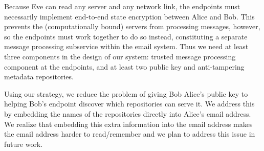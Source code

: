Because Eve can read any server and any network link, the endpoints 
must necessarily implement end-to-end state encryption between Alice 
and Bob.  This prevents the (computationally bound) servers from 
processing messages, however, so the endpoints must work together 
to do so instead, constituting a separate message processing subservice 
within the email system.  Thus we need at least three components in the 
design of our system: trusted message processing component at the 
endpoints, and at least two public key and anti-tampering metadata 
repositories.

Using our strategy, we reduce the problem of giving Bob Alice’s public 
key to helping Bob’s endpoint discover which repositories can serve it.  
We address this by embedding the names of the repositories directly into 
Alice’s email address. We realize that embedding this extra information 
into the email address makes the email address harder to read/remember 
and we plan to address this issue in future work. 
